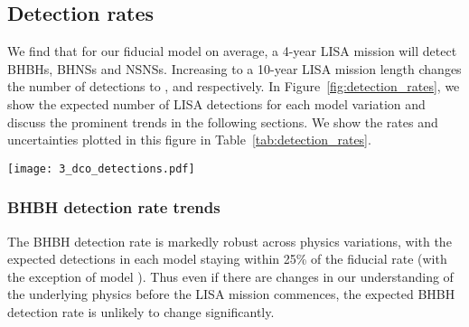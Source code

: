 \subsection{Detection rates}\label{sec:detection_rate_analysis}
We find that for our fiducial model on average, a 4-year LISA mission will detect \BHBHFourYear{} BHBHs, \BHNSFourYear{} BHNSs and \NSNSFourYear{} NSNSs. Increasing to a 10-year LISA mission length changes the number of detections to \BHBHTenYear{}, \BHNSTenYear{} and \NSNSTenYear{} respectively. In Figure~\ref{fig:detection_rates}, we show the expected number of LISA detections for each model variation and discuss the prominent trends in the following sections. We show the rates and uncertainties plotted in this figure in Table~\ref{tab:detection_rates}.

\begin{figure*}[p]
    \centering
    \texttt{[image: 3\_dco\_detections.pdf]}
    \caption{The number of expected detections in the LISA mission for different DCO types and model variations. Error bars show the 50\% (solid) and 90\% (dotted) confidence intervals. The left axis and grid lines show the number of detections in a 4-year LISA mission and the right axis shows an approximation of the number of detections in a 10-year mission (we scale the axis by $\sqrt{T_{\rm obs}}$, see Table~\ref{tab:detection_rates} for exact rates). Each model is described in further detail in Table~\ref{tab:physics_variations} and details of the fiducial assumptions are in Section~\ref{sec:fiducial_physics}. }
    \label{fig:detection_rates}
\end{figure*}

\subsubsection{BHBH detection rate trends}
The BHBH detection rate is markedly robust across physics variations, with the expected detections in each model staying within 25\% of the fiducial rate (with the exception of model \modOpt{}). Thus even if there are changes in our understanding of the underlying physics before the LISA mission commences, the expected BHBH detection rate is unlikely to change significantly.


